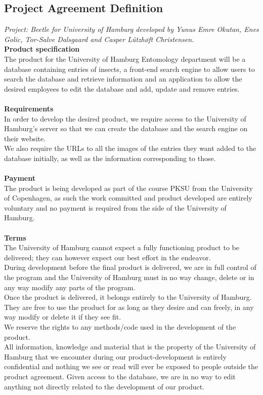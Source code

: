 \documentclass[12pt,a4paper]{article}
\begin{document}
\newpage
\subsection{Project Agreement Definition}
\textit{Project: Beetle for University of Hamburg developed by Yunus Emre Okutan, Enes Golic, Tor-Salve Dalsgaard and Casper Lützhøft Christensen.}\\

\textbf{Product specification}\\
The product for the University of Hamburg Entomology department will be a database containing entries of insects, a front-end search engine to allow users to search the database and retrieve information and an application to allow the desired employees to edit the database and add, update and remove entries.\\\\
\textbf{Requirements}\\
In order to develop the desired product, we require access to the University of Hamburg’s server so that we can create the database and the search engine on their website. \\
We also require the URLs to all the images of the entries they want added to the database initially, as well as the information corresponding to those.\\\\
\textbf{Payment}\\
The product is being developed as part of the course PKSU from the University of Copenhagen, as such the work committed and product developed are entirely voluntary and no payment is required from the side of the University of Hamburg.\\\\
\textbf{Terms}\\
The University of Hamburg cannot expect a fully functioning product to be delivered; they can however expect our best effort in the endeavor.\\
During development before the final product is delivered, we are in full control of the program and the University of Hamburg must in no way change, delete or in any way modify any parts of the program.\\
Once the product is delivered, it belongs entirely to the University of Hamburg. They are free to use the product for as long as they desire and can freely, in any way modify or delete it if they see fit.\\
We reserve the rights to any methods/code used in the development of the product.\\
All information, knowledge and material that is the property of the University of Hamburg that we encounter during our product-development is entirely confidential and nothing we see or read will ever be exposed to people outside the product agreement.
Given access to the database, we are in no way to edit anything not directly related to the development of our product.\\\\
\end{document}
